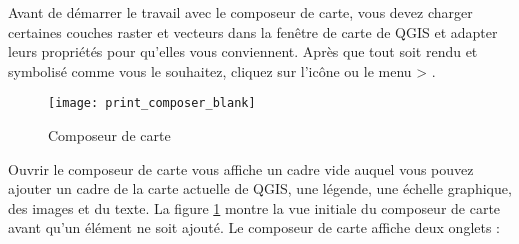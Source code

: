 Avant de démarrer le travail avec le composeur de carte, vous devez charger certaines couches raster et vecteurs dans la fenêtre de carte de QGIS et 
adapter leurs propriétés pour qu'elles vous conviennent. Après que tout soit rendu et symbolisé comme vous le souhaitez, cliquez sur l'icône  ou le menu  > .


\begin{figure}[ht]
   \begin{center}
   \caption{Composeur de carte\nixcaption}\label{fig:print_composer_blank}\smallskip
   \texttt{[image: print\_composer\_blank]}
\end{center}
\end{figure}

Ouvrir le composeur de carte vous affiche un cadre vide auquel vous pouvez ajouter un cadre de la carte actuelle de QGIS, une légende, une échelle
graphique, des images et du texte. La figure \ref{fig:print_composer_blank} montre la vue initiale du composeur de carte avant qu'un élément ne soit ajouté. Le composeur de carte affiche deux onglets :

